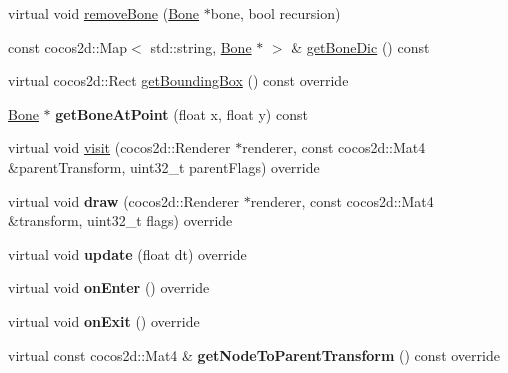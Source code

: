 \begin{DoxyCompactItemize}
\item 
virtual void \hyperlink{classcocostudio_1_1Armature_aefa283cddbe9761986b4c76dd5301865}{remove\+Bone} (\hyperlink{classcocostudio_1_1Bone}{Bone} $\ast$bone, bool recursion)
\item 
const cocos2d\+::\+Map$<$ std\+::string, \hyperlink{classcocostudio_1_1Bone}{Bone} $\ast$ $>$ \& \hyperlink{classcocostudio_1_1Armature_a87c56d4bba4ed13a510cd1b2781465a3}{get\+Bone\+Dic} () const
\item 
virtual cocos2d\+::\+Rect \hyperlink{classcocostudio_1_1Armature_af7afbacf2d682e65cee5c791c47a68b6}{get\+Bounding\+Box} () const override
\item 
\mbox{\label{classcocostudio_1_1Armature_aa10caa433ab4b698f002204fba292ce5}} 
\hyperlink{classcocostudio_1_1Bone}{Bone} $\ast$ {\bfseries get\+Bone\+At\+Point} (float x, float y) const
\item 
virtual void \hyperlink{classcocostudio_1_1Armature_a1937eec5f06a4d889d2a46612b027714}{visit} (cocos2d\+::\+Renderer $\ast$renderer, const cocos2d\+::\+Mat4 \&parent\+Transform, uint32\+\_\+t parent\+Flags) override
\item 
\mbox{\label{classcocostudio_1_1Armature_aee8a1edbefa706f6e6d71ab704b150ed}} 
virtual void {\bfseries draw} (cocos2d\+::\+Renderer $\ast$renderer, const cocos2d\+::\+Mat4 \&transform, uint32\+\_\+t flags) override
\item 
\mbox{\label{classcocostudio_1_1Armature_a7cae826997205a4a334da799575e2444}} 
virtual void {\bfseries update} (float dt) override
\item 
\mbox{\label{classcocostudio_1_1Armature_a5aa5a5a2712964b385a7a5e8facf748b}} 
virtual void {\bfseries on\+Enter} () override
\item 
\mbox{\label{classcocostudio_1_1Armature_adaa7b806fbf93d81f0439a3ea16dce3a}} 
virtual void {\bfseries on\+Exit} () override
\item 
\mbox{\label{classcocostudio_1_1Armature_a9e28f0404b34c3a84fb3b47e566bf671}} 
virtual const cocos2d\+::\+Mat4 \& {\bfseries get\+Node\+To\+Parent\+Transform} () const override
\item 

\end{DoxyCompactItemize}
